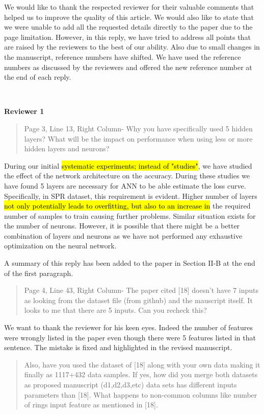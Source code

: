 \documentclass{article}
\begin{document}
	We would like to thank the respected reviewer for their valuable comments that helped us to improve the quality of this article. We would also like to state that we were unable to add all the requested details directly to the paper due to the page limitation. However, in this reply, we have tried to address all points that are raised by the reviewers to the best of our ability. Also due to small changes in the manuscript, reference numbers have shifted. We have used the reference numbers as discussed by the reviewers and offered the new reference number at the end of each reply.
	
	~
	
	{\bfseries\large Reviewer 1}
	
	\begin{quote}
	Page 3, Line 13, Right Column- Why you have specifically used 5 hidden layers? What will be the impact on performance when using less or more hidden layers and neurons?
	\end{quote}
	
	During our initial \hl{systematic experiments; instead of "studies"}, we have studied the effect of the network architecture on the accuracy. During these studies we have found 5 layers are necessary for ANN to be able estimate the loss curve. Specifically, in SPR dataset, this requirement is evident. Higher number of layers \hl{not only potentially leads to overfitting, but also to an  increase in} the required number of samples to train causing further problems. Similar situation exists for the number of neurons. However, it is possible that there might be a better combination of layers and neurons as we have not performed any exhaustive optimization on the neural network.
	
	A summary of this reply has been added to the paper in Section II-B at the end of the first paragraph.
	
	\begin{quote}
	Page 4, Line 43, Right Column- The paper cited [18] doesn't have 7 inputs as looking from the dataset file (from github) and the mauscript itself. It looks to me that there are 5 inputs. Can you recheck this?
	\end{quote}
	
	We want to thank the reviewer for his keen eyes. Indeed the number of features were wrongly listed in the paper even though there were 5 features listed in that sentence. The mistake is fixed and highlighted in the revised manuscript.
	
	\begin{quote}
	Also, have you used the dataset of [18] along with your own data making it finally as 1117+432 data samples. If yes, how did you merge both datasets as proposed manuscript (d1,d2,d3,etc) data sets has different inputs parameters than [18]. What happens to non-common columns like number of rings input feature as mentioned in [18].
	\end{quote}
	
\end{document}
